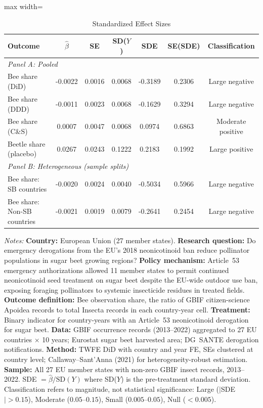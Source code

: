 \begin{table}[htbp]
\centering
\caption{Standardized Effect Sizes}
\label{tab:sde}
\begin{adjustbox}{max width=\textwidth}
\begin{tabular}{lcccccc}
\toprule
Outcome & $\hat{\beta}$ & SE & SD($Y$) & SDE & SE(SDE) & Classification \\
\midrule
\multicolumn{7}{l}{\textit{Panel A: Pooled}} \\
Bee share (DiD) & -0.0022 & 0.0016 & 0.0068 & -0.3189 & 0.2306 & Large negative \\
Bee share (DDD) & -0.0011 & 0.0023 & 0.0068 & -0.1629 & 0.3294 & Large negative \\
Bee share (C\&S) & 0.0007 & 0.0047 & 0.0068 & 0.0974 & 0.6863 & Moderate positive \\
Beetle share (placebo) & 0.0267 & 0.0243 & 0.1222 & 0.2183 & 0.1992 & Large positive \\
\midrule
\multicolumn{7}{l}{\textit{Panel B: Heterogeneous (sample splits)}} \\
Bee share: SB countries & -0.0020 & 0.0024 & 0.0040 & -0.5034 & 0.5966 & Large negative \\
Bee share: Non-SB countries & -0.0021 & 0.0019 & 0.0079 & -0.2641 & 0.2454 & Large negative \\
\bottomrule
\end{tabular}
\end{adjustbox}
\par\vspace{0.3em}
{\scriptsize \textit{Notes:}
\textbf{Country:} European Union (27 member states).
\textbf{Research question:} Do emergency derogations from the EU's 2018 neonicotinoid ban reduce pollinator populations in sugar beet growing regions?
\textbf{Policy mechanism:} Article~53 emergency authorizations allowed 11 member states to permit continued neonicotinoid seed treatment on sugar beet despite the EU-wide outdoor use ban, exposing foraging pollinators to systemic insecticide residues in treated fields.
\textbf{Outcome definition:} Bee observation share, the ratio of GBIF citizen-science Apoidea records to total Insecta records in each country-year cell.
\textbf{Treatment:} Binary indicator for country-years with an Article~53 neonicotinoid derogation for sugar beet.
\textbf{Data:} GBIF occurrence records (2013--2022) aggregated to 27 EU countries $\times$ 10 years; Eurostat sugar beet harvested area; DG~SANTE derogation notifications.
\textbf{Method:} TWFE DiD with country and year FE, SEs clustered at country level; Callaway--Sant'Anna (2021) for heterogeneity-robust estimation.
\textbf{Sample:} All 27 EU member states with non-zero GBIF insect records, 2013--2022.
SDE $= \hat{\beta} / \text{SD}(Y)$ where SD($Y$) is the pre-treatment standard deviation.
Classification refers to magnitude, not statistical significance:
Large ($|$SDE$| > 0.15$), Moderate ($0.05$--$0.15$), Small ($0.005$--$0.05$), Null ($< 0.005$).}
\end{table}
